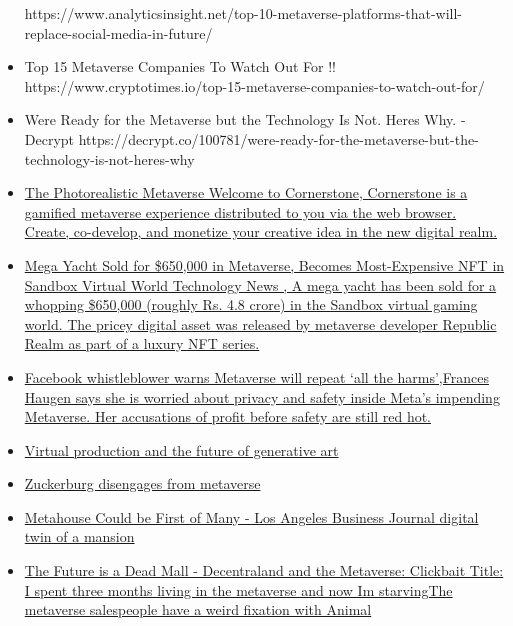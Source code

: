 \begin{itemize}
  https://www.analyticsinsight.net/top-10-metaverse-platforms-that-will-replace-social-media-in-future/
\item
  Top 15 Metaverse Companies To Watch Out For !!
  https://www.cryptotimes.io/top-15-metaverse-companies-to-watch-out-for/
\item
  We\textquotesingle re Ready for the Metaverse but the Technology Is
  Not. Here\textquotesingle s Why. - Decrypt
  https://decrypt.co/100781/were-ready-for-the-metaverse-but-the-technology-is-not-heres-why
\item
  \href{https://cornerstone.land/}{The Photorealistic Metaverse
  \textbar{} Welcome to Cornerstone, Cornerstone is a gamified metaverse
  experience distributed to you via the web browser. Create, co-develop,
  and monetize your creative idea in the new digital realm.}
\item
  \href{https://gadgets.ndtv.com/cryptocurrency/news/mega-yacht-sold-usd-650000-metaverse-most-expensive-nft-sandbox-virtual-world-2630187}{Mega
  Yacht Sold for \$650,000 in Metaverse, Becomes Most-Expensive NFT in
  Sandbox Virtual World \textbar{} Technology News , A mega yacht has
  been sold for a whopping \$650,000 (roughly Rs. 4.8 crore) in the
  Sandbox virtual gaming world. The pricey digital asset was released by
  metaverse developer Republic Realm as part of a luxury NFT series.}
\item
  \href{https://cointelegraph.com/news/facebook-whistleblower-warns-metaverse-will-repeat-the-harms}{Facebook
  whistleblower warns Metaverse will repeat `all the harms',Frances
  Haugen says she is worried about privacy and safety inside Meta's
  impending Metaverse. Her accusations of profit before safety are still
  red hot.}
\item
  \href{https://virtualproducer.io/generative-ai-and-the-future-of-filmmaking/}{Virtual
  production and the future of generative art}
\item
  \href{https://www.thestreet.com/technology/mark-zuckerberg-quietly-buries-the-metaverse}{Zuckerburg
  disengages from metaverse}
\item
  \href{https://labusinessjournal.com/featured/metahouse-could-be-first-of-many/}{Metahouse
  Could be First of Many - Los Angeles Business Journal digital twin of
  a mansion}
\item
  \href{https://www.youtube.com/watch?v=EiZhdpLXZ8Q}{The Future is a
  Dead Mall - Decentraland and the Metaverse: Clickbait Title: I spent
  three months living in the metaverse and now I\textquotesingle m
  starvingThe metaverse salespeople have a weird fixation with Animal
}
\end{itemize}
